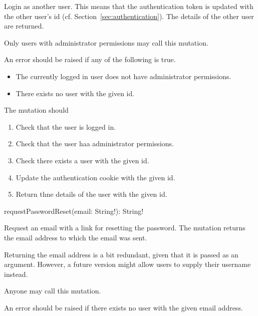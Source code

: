 Login as another user. This means that the authentication token is updated with the other user's id (cf. Section~\ref{sec:authentication}). The details of the other user are returned.

\restrictions

Only users with administrator permissions may call this mutation.

\errors

An error should be raised if any of the following is true.

\begin{itemize}
    \item The currently logged in user does not have administrator permissions.
    \item There exists no user with the given id.
\end{itemize}

\functionality

The mutation should

\begin{enumerate}
    \item Check that the user is logged in.
    \item Check that the user haa administrator permissions.
    \item Check there exists a user with the given id.
    \item Update the authentication cookie with the given id.
    \item Return thne details of the user with the given id.
\end{enumerate}


\begin{code}
requestPasswordReset(email: String!): String!
\end{code}

Request an email with a link for resetting the password. The mutation returns the email address to which the email was sent.

\begin{note}
Returning the email address is a bit redundant, given that it is passed as an argument. However, a future version might allow users to supply their username instead.
\end{note}

\restrictions

Anyone may call this mutation.

\errors

An error should be raised if there exists no user with the given email address.

